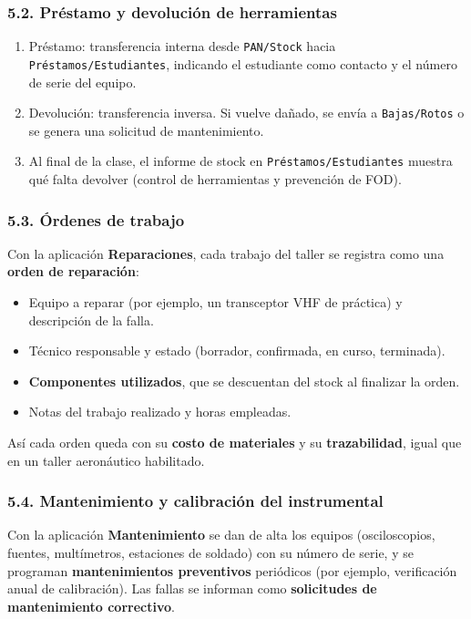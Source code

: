 \subsubsection*{5.2. Préstamo y devolución de herramientas}
\begin{enumerate}
  \item Préstamo: transferencia interna desde \texttt{PAN/Stock} hacia
        \texttt{Préstamos/Estudiantes}, indicando el estudiante como contacto y el número de
        serie del equipo.
  \item Devolución: transferencia inversa. Si vuelve dañado, se envía a \texttt{Bajas/Rotos}
        o se genera una solicitud de mantenimiento.
  \item Al final de la clase, el informe de stock en \texttt{Préstamos/Estudiantes} muestra
        qué falta devolver (control de herramientas y prevención de FOD).
\end{enumerate}

\subsubsection*{5.3. Órdenes de trabajo}
Con la aplicación \textbf{Reparaciones}, cada trabajo del taller se registra como una
\textbf{orden de reparación}:
\begin{itemize}
  \item Equipo a reparar (por ejemplo, un transceptor VHF de práctica) y descripción de la
        falla.
  \item Técnico responsable y estado (borrador, confirmada, en curso, terminada).
  \item \textbf{Componentes utilizados}, que se descuentan del stock al finalizar la orden.
  \item Notas del trabajo realizado y horas empleadas.
\end{itemize}
Así cada orden queda con su \textbf{costo de materiales} y su \textbf{trazabilidad}, igual que
en un taller aeronáutico habilitado.

\subsubsection*{5.4. Mantenimiento y calibración del instrumental}
Con la aplicación \textbf{Mantenimiento} se dan de alta los equipos (osciloscopios, fuentes,
multímetros, estaciones de soldado) con su número de serie, y se programan
\textbf{mantenimientos preventivos} periódicos (por ejemplo, verificación anual de
calibración). Las fallas se informan como \textbf{solicitudes de mantenimiento correctivo}.


